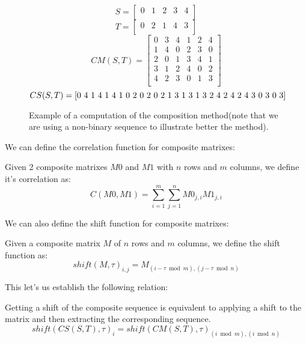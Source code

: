 \begin{figure}[ht!]
  $$S = \begin{bmatrix}
    0 & 1 & 2 & 3 & 4\\
  \end{bmatrix}$$
  $$T = \begin{bmatrix}
    0 & 2 & 1 & 4 & 3 \\
  \end{bmatrix}
  $$
  $$CM(S, T) = \begin{bmatrix}
  0 & 3 & 4 & 1 & 2 & 4\\
  1 & 4 & 0 & 2 & 3 & 0\\
  2 & 0 & 1 & 3 & 4 & 1\\
  3 & 1 & 2 & 4 & 0 & 2\\
  4 & 2 & 3 & 0 & 1 & 3\\
  \end{bmatrix}
  $$
  $$CS(S, T) = \text{[0 4 1 4 1 4 1 0 2 0 2 0 2 1 3 1 3 1 3 2 4 2 4 2 4 3 0 3 0 3]}\\
  $$
  \caption{Example of a computation of the composition method(note that we are
  using a non-binary sequence to illustrate better the method).}
  \label{}
\end{figure}

We can define the correlation function for composite matrixes:

\begin{definition}
  Given 2 composite matrixes $M0$ and $M1$ with $n$ rows and $m$ columns,
  we define it's correlation as:
  \begin{equation}
    C(M0, M1) = \sum_{i=1}^{m}\sum_{j=1}^{n}M0_{j, i}M1_{j,i}
  \end{equation}
\end{definition}

We can also define the shift function for composite matrixes:

\begin{definition}
  Given a composite matrix $M$ of $n$ rows and $m$ columns, we define the
  shift function as:
  \begin{equation}
    shift(M, \tau)_{i, j} = M_{(i-\tau \bmod m), (j-\tau \bmod n)}
  \end{equation}
\end{definition}
This let's us establish the following relation:
  \begin{corollary} Getting a shift of the composite sequence is equivalent to
  applying a shift to the matrix and then extracting the corresponding
  sequence.
    \begin{equation}
      shift(CS(S, T), \tau)_{i} = shift(CM(S, T), \tau)_{(i \bmod m), (i \bmod n)}
    \end{equation}
  \end{corollary}


